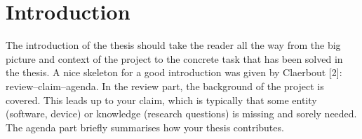 \chapter{Introduction}

The introduction of the thesis should take the reader all the way from the big picture and context of the project to the concrete task that has been solved in the thesis. A nice skeleton for a good introduction was given by Claerbout [2]: review–claim–agenda. In the review part, the background of the project is covered. This leads up to your claim, which is typically that some entity (software, device) or knowledge (research questions) is missing and sorely needed. The agenda part briefly summarises how your thesis contributes. 
